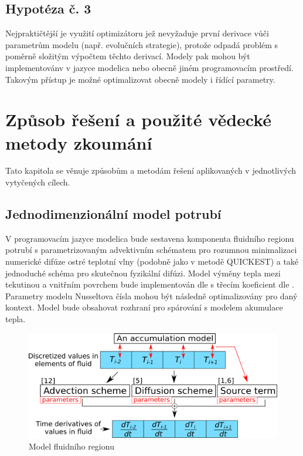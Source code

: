 \section*{Hypotéza č. 3}
Nejpraktičtější je využití optimizátoru jež nevyžaduje první derivace vůči
parametrům modelu (např. evolučních strategie), protože odpadá problém s
poměrně složitým výpočtem těchto derivací. Modely pak mohou být implementovánv
v jazyce modelica nebo obecně jiném programovacím prostředí. Takovým přístup je
možné optimalizovat obecně modely i řídící parametry.
\chapter{Způsob řešení a použité vědecké metody zkoumání}
Tato kapitola se věnuje způsobům a metodám řešení aplikovaných v jednotlivých
vytyčených cílech.
\section{Jednodimenzionální model potrubí}
\label{sec:1Dpipe}
V programovacím jazyce modelica bude sestavena komponenta fluidního regionu
potrubí s parametrizovaným advektivním schématem pro rozumnou minimalizaci
numerické difúze ostré teplotní vlny (podobně jako v metodě QUICKEST) a také
jednoduché schéma pro skutečnou fyzikální difúzi. Model výměny tepla mezi
tekutinou a vnitřním povrchem bude implementován dle \cite{Abraham2009} s
třecím koeficient dle \cite{Churchill1977}. Parametry modelu Nusseltova čísla
mohou být následně optimalizovány pro daný kontext. Model bude obsahovat
rozhraní pro spárování s modelem akumulace tepla.
\begin{figure}[h]
\begin{center}
  \includegraphics[scale=0.9]{figures/1D_model_pipe}
\end{center}
\caption{Model fluidního regionu}
\label{fig:pipe_model}
\end{figure}

